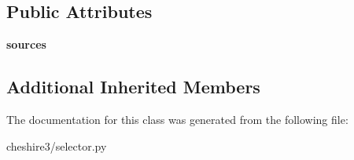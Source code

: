 \subsection*{Public Attributes}
\begin{DoxyCompactItemize}
\item 
\hypertarget{classcheshire3_1_1selector_1_1_span_x_path_selector_a1b45c1da51bca5343044d29d8d42378c}{{\bfseries sources}}\label{classcheshire3_1_1selector_1_1_span_x_path_selector_a1b45c1da51bca5343044d29d8d42378c}

\end{DoxyCompactItemize}
\subsection*{Additional Inherited Members}


The documentation for this class was generated from the following file\-:\begin{DoxyCompactItemize}
\item 
cheshire3/selector.\-py\end{DoxyCompactItemize}
